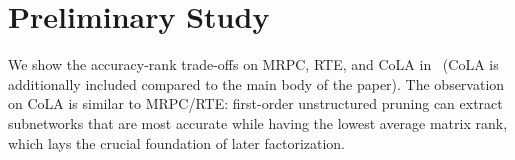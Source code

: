 \section{Preliminary Study}
\label{sec:A}
We show the accuracy-rank trade-offs on MRPC, RTE, and CoLA in ~(CoLA is additionally included compared to the main body of the paper). The observation on CoLA is similar to MRPC/RTE: first-order unstructured pruning can extract subnetworks that are most accurate while having the lowest average matrix rank, which lays the crucial foundation of later factorization.

